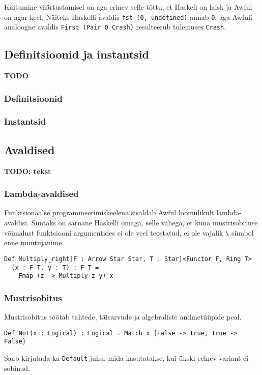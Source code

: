 \documentclass[12pt]{article}
\newcommand\markus[1]{\textcolor{roheline}{\textbf{#1}}}
\begin{document}
        Käitumine väärtustamisel on aga erinev selle tõttu, et Haskell on laisk ja Awful on agar keel. Näiteks Haskelli avaldis \verb!fst (0, undefined)! annab \verb!0!, aga Awfuli analoogne avaldis \verb!First (Pair 0 Crash)! resulteerub tulemuses \verb!Crash!.
    \subsection{Definitsioonid ja instantsid}
      \markus{TODO}
      \subsubsection{Definitsioonid}
        
      \subsubsection{Instantsid}
        
    \subsection{Avaldised}
      \markus{TODO: tekst}
      \subsubsection{Lambda-avaldised}
        Funktsionaalse programmeerimiskeelena sisaldab Awful loomulikult lambda-avaldisi. Süntaks on sarnane Haskelli omaga, selle vahega, et kuna mustrisobituse võimalust funktsiooni argumentides ei ole veel teostatud, ei ole vajalik \verb!\! sümbol enne muutujanime.

        \begin{verbatim}Def Multiply_right[F : Arrow Star Star, T : Star]<Functor F, Ring T>
  (x : F T, y : T) : F T =
    Fmap (z -> Multiply z y) x\end{verbatim}
      \subsubsection{Mustrisobitus}\label{match}
        Mustrisobitus töötab tähtede, täisarvude ja algebraliste andmetüüpide peal.

        \begin{verbatim}Def Not(x : Logical) : Logical = Match x {False -> True, True -> False}\end{verbatim}

        Saab kirjutada ka \verb!Default! juhu, mida kasutatakse, kui ükski eelnev variant ei sobinud.
\end{document}

